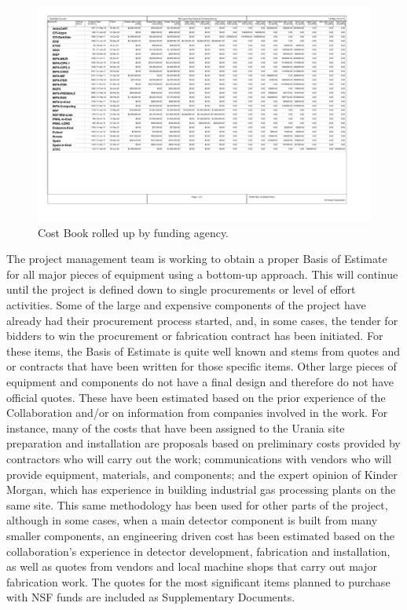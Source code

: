 \begin{figure} [!th]
\includegraphics[rotate=90, width=0.85\columnwidth]{./Appendices/AgencyViewRolled.pdf}
\caption[Cost Book]{Cost Book rolled up by funding agency.}
\label{fig:CostBook} 
\end{figure} 

The project management team is working to obtain a proper Basis of Estimate for all major pieces of equipment using a bottom-up approach. This will continue until the project is defined down to single procurements or level of effort activities.  Some of the large and expensive components of the project have already had their procurement process started, and, in some cases, the tender for bidders to win the procurement or fabrication contract has been initiated.  For these items, the Basis of Estimate is quite well known and stems from quotes and or contracts that have been written for those specific items.  Other large pieces of equipment and components do not have a final design and therefore do not have official quotes. These have been estimated based on the prior experience of the Collaboration and/or on information from companies involved in the work.  For instance, many of the costs that have been assigned to the Urania site preparation and installation are proposals based on preliminary costs provided by contractors who will carry out the work; communications with vendors who will provide equipment, materials, and components; and the expert opinion of Kinder Morgan, which has experience in building industrial gas processing plants on the same site. This same methodology has been used for other parts of the project, although in some cases, when a main detector component is built from many smaller components, an engineering driven cost has been estimated based on the collaboration's experience in detector development, fabrication and installation, as well as quotes from vendors and local machine shops that carry out major fabrication work. The quotes for the most significant items planned to purchase with NSF funds are included as Supplementary Documents.

